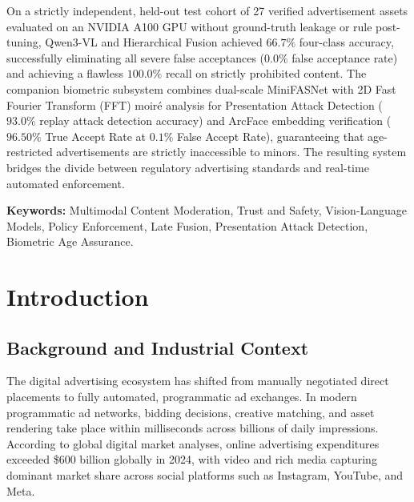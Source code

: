\documentclass[12pt,a4paper]{report}
\begin{document}
On a strictly independent, held-out test cohort of 27 verified advertisement assets evaluated on an NVIDIA A100 GPU without ground-truth leakage or rule post-tuning, Qwen3-VL and Hierarchical Fusion achieved $66.7\%$ four-class accuracy, successfully eliminating all severe false acceptances ($0.0\%$ false acceptance rate) and achieving a flawless $100.0\%$ recall on strictly prohibited content. The companion biometric subsystem combines dual-scale MiniFASNet with 2D Fast Fourier Transform (FFT) moir\'{e} analysis for Presentation Attack Detection ($93.0\%$ replay attack detection accuracy) and ArcFace embedding verification ($96.50\%$ True Accept Rate at $0.1\%$ False Accept Rate), guaranteeing that age-restricted advertisements are strictly inaccessible to minors. The resulting system bridges the divide between regulatory advertising standards and real-time automated enforcement.

\vspace{0.4cm}
\noindent \textbf{Keywords:} Multimodal Content Moderation, Trust and Safety, Vision-Language Models, Policy Enforcement, Late Fusion, Presentation Attack Detection, Biometric Age Assurance.


\newpage
\tableofcontents

\newpage
\listoffigures

\newpage
\listoftables

\newpage
{}
\setcounter{page}{1}


\chapter{Introduction}
\label{ch:intro}

\section{Background and Industrial Context}
The digital advertising ecosystem has shifted from manually negotiated direct placements to fully automated, programmatic ad exchanges. In modern programmatic ad networks, bidding decisions, creative matching, and asset rendering take place within milliseconds across billions of daily impressions. According to global digital market analyses, online advertising expenditures exceeded \$600 billion globally in 2024, with video and rich media capturing dominant market share across social platforms such as Instagram, YouTube, and Meta.
\end{document}

